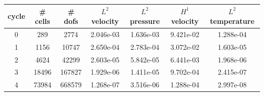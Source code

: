 \documentclass[10pt]{report}
\begin{document}
\begin{table}[H]
\begin{center}
\begin{tabular}{|c|c|c|c|c|c|c|} \hline
cycle & \# cells & \# dofs & $L^2$ velocity & $L^2$ pressure & $H^1$ velocity & $L^2$ temperature\\ \hline
0 & 289 & 2774 & 2.046e-03 & 1.636e-03 & 9.421e-02 & 1.288e-04\\ \hline
1 & 1156 & 10747 & 2.650e-04 & 2.783e-04 & 3.072e-02 & 1.603e-05\\ \hline
2 & 4624 & 42299 & 2.603e-05 & 5.842e-05 & 6.441e-03 & 1.968e-06\\ \hline
3 & 18496 & 167827 & 1.929e-06 & 1.411e-05 & 9.702e-04 & 2.415e-07\\ \hline
4 & 73984 & 668579 & 1.268e-07 & 3.516e-06 & 1.288e-04 & 2.997e-08\\ \hline
\end{tabular}
\end{center}
\end{table}
\end{document}

